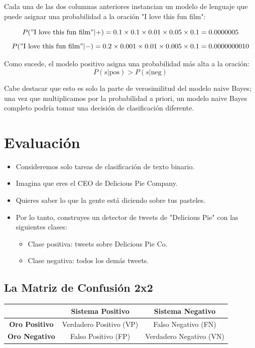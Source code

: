 Cada una de las dos columnas anteriores instancian un modelo de lenguaje que puede asignar una probabilidad a la oración "I love this fun film":

\[P("\text{I love this fun film}"|+) = 0.1 \times 0.1 \times 0.01 \times 0.05 \times 0.1 = 0.0000005\]
\[P("\text{I love this fun film}"|-) = 0.2 \times 0.001 \times 0.01 \times 0.005 \times 0.1 = 0.0000000010\]

Como sucede, el modelo positivo asigna una probabilidad más alta a la oración:
\[P(s|\text{pos}) > P(s|\text{neg})\]

Cabe destacar que esto es solo la parte de verosimilitud del modelo naive Bayes; una vez que multiplicamos por la probabilidad a priori, un modelo naive Bayes completo podría tomar una decisión de clasificación diferente.



\section{Evaluación}

\begin{itemize}
 \item Consideremos solo tareas de clasificación de texto binario.
 \item Imagina que eres el CEO de Delicious Pie Company.
 \item Quieres saber lo que la gente está diciendo sobre tus pasteles.
 \item Por lo tanto, construyes un detector de tweets de "Delicious Pie" con las siguientes clases:
\begin{itemize}
\item Clase positiva: tweets sobre Delicious Pie Co.
\item Clase negativa: todos los demás tweets.
\end{itemize}
\end{itemize}



\subsection{La Matriz de Confusión 2x2}
\begin{table}[h]
\centering
\begin{tabular}{|c|c|c|}
\hline
\textbf{} & \textbf{Sistema Positivo} & \textbf{Sistema Negativo} \\
\hline
\textbf{Oro Positivo} & Verdadero Positivo (VP) & Falso Negativo (FN) \\
\hline
\textbf{Oro Negativo} & Falso Positivo (FP) & Verdadero Negativo (VN) \\
\hline
\end{tabular}
\end{table}

